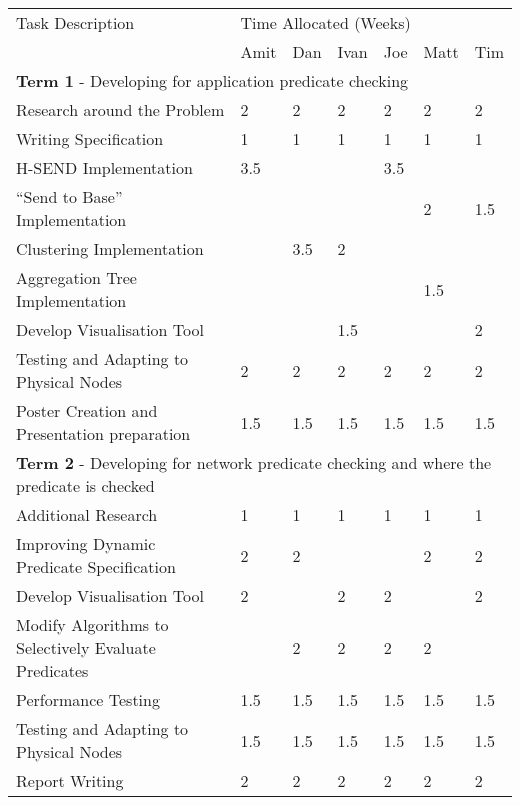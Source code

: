 \begin{table}[H]
	\centering
	\begin{tabular}{| l | l | l | l | l | l | l |}
	\hline
	Task Description & \multicolumn{6}{|l|}{Time Allocated (Weeks)}\\
	~ & Amit & Dan & Ivan & Joe & Matt & Tim \\
	\hline
	\hline
	\multicolumn{7}{|l|}{\textbf{Term 1} - Developing for application predicate checking} \\
	\hline


	Research around the Problem & 2 & 2 & 2 & 2 & 2 & 2\\
	Writing Specification & 1 & 1 & 1 & 1 & 1 & 1\\
	H-SEND Implementation & 3.5 & ~ & ~ & 3.5 & ~ & ~\\
	``Send to Base'' Implementation & ~ & ~ & ~ & ~ & 2 & 1.5\\
	Clustering Implementation & ~ & 3.5 & 2 & ~ & ~ & ~\\
	Aggregation Tree Implementation & ~ & ~ & ~ & ~ & 1.5 & ~\\
	Develop Visualisation Tool & ~ & ~ & 1.5 & ~ & ~ & 2\\
	Testing and Adapting to Physical Nodes & 2 & 2 & 2 & 2 & 2 & 2\\
	Poster Creation and Presentation preparation & 1.5 & 1.5 & 1.5 & 1.5 & 1.5 & 1.5\\

	\hline
	\hline
	\multicolumn{7}{|l|}{\textbf{Term 2} - Developing for network predicate checking and where the predicate is checked} \\
	\hline
	
	Additional Research & 1 & 1 & 1 & 1 & 1 & 1\\
	Improving Dynamic Predicate Specification & 2 & 2 & ~ & ~ & 2 & 2\\
	Develop Visualisation Tool & 2 & ~ & 2 & 2 & ~ & 2\\
	Modify Algorithms to Selectively Evaluate Predicates & ~ & 2 & 2 & 2 & 2 & ~\\
	Performance Testing & 1.5 & 1.5 & 1.5 & 1.5 & 1.5 & 1.5\\
	Testing and Adapting to Physical Nodes & 1.5 & 1.5 & 1.5 & 1.5 & 1.5 & 1.5\\
	Report Writing & 2 & 2 & 2 & 2 & 2 & 2\\
	
	\hline
	
	\end{tabular}
\end{table}

